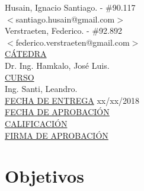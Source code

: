 \begin{titlepage}
\begin{tabbing}
		Husain, Ignacio Santiago.	\>\>- \#90.117\\
		\>\footnotesize{$<$santiago.husain@gmail.com$>$}\\

		Verstraeten, Federico.	\>\>- \#92.892\\
		\>\footnotesize{$<$federico.verstraeten@gmail.com$>$}\\

		\<\underline{CÁTEDRA}\\[0.2cm]
		Dr. Ing. Hamkalo, José Luis. \\

		\<\underline{CURSO}\\[0.2cm]
		Ing. Santi, Leandro. \\[1cm]

		\<\underline{FECHA DE ENTREGA}\>\>\> xx/xx/2018
		\\[0.2cm]

		\<\underline{FECHA DE APROBACIÓN}\>\>\>
		\\[0.2cm]

		\<\underline{CALIFICACIÓN}\>\>\>
		\\[0.2cm]

		\<\underline{FIRMA DE APROBACIÓN}
		\\[0.5cm]

	\end{tabbing}




\end{titlepage}

\clearpage

\tableofcontents

\clearpage



\section{Objetivos}

